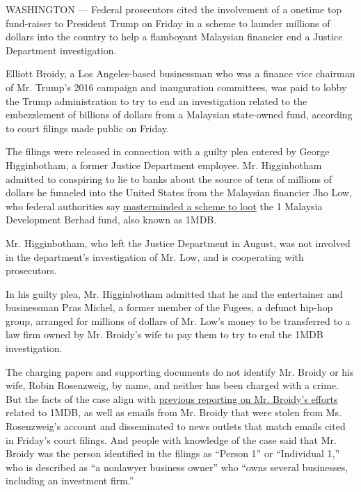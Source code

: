 WASHINGTON --- Federal prosecutors cited the involvement of a onetime
top fund-raiser to President Trump on Friday in a scheme to launder
millions of dollars into the country to help a flamboyant Malaysian
financier end a Justice Department investigation.

Elliott Broidy, a Los Angeles-based businessman who was a finance vice
chairman of Mr. Trump's 2016 campaign and inauguration committees, was
paid to lobby the Trump administration to try to end an investigation
related to the embezzlement of billions of dollars from a Malaysian
state-owned fund, according to court filings made public on Friday.

The filings were released in connection with a guilty plea entered by
George Higginbotham, a former Justice Department employee. Mr.
Higginbotham admitted to conspiring to lie to banks about the source of
tens of millions of dollars he funneled into the United States from the
Malaysian financier Jho Low, who federal authorities say
\href{https://www.nytimes.com/2018/08/24/world/asia/jho-low-malaysia-1mdb.html}{masterminded
a scheme to loot} the 1 Malaysia Development Berhad fund, also known as
1MDB.

Mr. Higginbotham, who left the Justice Department in August, was not
involved in the department's investigation of Mr. Low, and is
cooperating with prosecutors.

In his guilty plea, Mr. Higginbotham admitted that he and the
entertainer and businessman Pras Michel, a former member of the Fugees,
a defunct hip-hop group, arranged for millions of dollars of Mr. Low's
money to be transferred to a law firm owned by Mr. Broidy's wife to pay
them to try to end the 1MDB investigation.

The charging papers and supporting documents do not identify Mr. Broidy
or his wife, Robin Rosenzweig, by name, and neither has been charged
with a crime. But the facts of the case align with
\href{https://www.nytimes.com/2018/04/19/world/asia/elliott-broidy-trump-malaysia-china-guo.html}{previous
reporting on Mr. Broidy's efforts} related to 1MDB, as well as emails
from Mr. Broidy that were stolen from Ms. Rosenzweig's account and
disseminated to news outlets that match emails cited in Friday's court
filings. And people with knowledge of the case said that Mr. Broidy was
the person identified in the filings as ``Person 1'' or ``Individual
1,'' who is described as ``a nonlawyer business owner'' who ``owns
several businesses, including an investment firm.''

